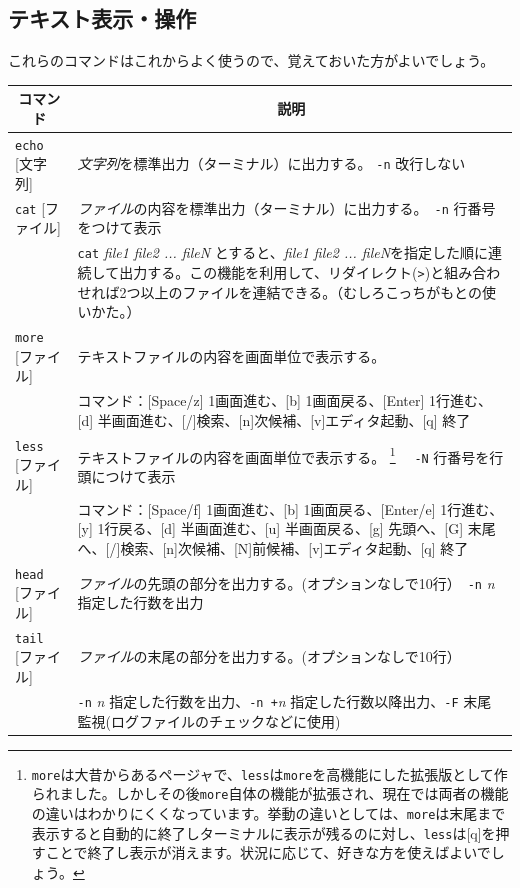 \documentclass[a4j]{ltjsreport}
\newcommand{\cn}[1]{\multirow{2}{*}{#1}}
\begin{document}
    \subsection{テキスト表示・操作}
    これらのコマンドはこれからよく使うので、覚えておいた方がよいでしょう。
    \begin{longtable}[c]{|p{3.5cm}|p{13.5cm}|}
        \hline
        \multicolumn{1}{|c|}{\textbf{コマンド}}&\multicolumn{1}{|c|}{\textbf{説明}}\\
        \hline\hline
        \texttt{echo} [文字列] &\emph{文字列}を標準出力（ターミナル）に出力する。 \texttt{-n} 改行しない\\
        \hline
        \texttt{cat} [ファイル] &\emph{ファイル}の内容を標準出力（ターミナル）に出力する。\ \texttt{-n} 行番号をつけて表示 \\
        &\texttt{cat} \textit{file1 file2 ... fileN} とすると、\textit{file1 file2 ... fileN}を指定した順に連続して出力する。この機能を利用して、リダイレクト(\verb|>|)と組み合わせれば2つ以上のファイルを連結できる。（むしろこっちがもとの使いかた。）\\
        \hline
        \texttt{more} [ファイル] &テキストファイルの内容を画面単位で表示する。\\
        &コマンド：[Space/z] 1画面進む、[b] 1画面戻る、[Enter] 1行進む、[d] 半画面進む、[/]検索、[n]次候補、[v]エディタ起動、[q] 終了\\
        \hline
        \texttt{less} [ファイル] &テキストファイルの内容を画面単位で表示する。
        \footnote{\texttt{more}は大昔からあるページャで、\texttt{less}は\texttt{more}を高機能にした拡張版として作られました。しかしその後\texttt{more}自体の機能が拡張され、現在では両者の機能の違いはわかりにくくなっています。挙動の違いとしては、\texttt{more}は末尾まで表示すると自動的に終了しターミナルに表示が残るのに対し、\texttt{less}は[q]を押すことで終了し表示が消えます。状況に応じて、好きな方を使えばよいでしょう。} 
        \ \ \texttt{-N} 行番号を行頭につけて表示\\
        &コマンド：[Space/f] 1画面進む、[b] 1画面戻る、[Enter/e] 1行進む、[y] 1行戻る、[d] 半画面進む、[u] 半画面戻る、[g] 先頭へ、[G] 末尾へ、[/]検索、[n]次候補、[N]前候補、[v]エディタ起動、[q] 終了\\
        \hline

        \texttt{head} [ファイル] &\emph{ファイル}の先頭の部分を出力する。(オプションなしで10行）\ \texttt{-n} \textit{n} 指定した行数を出力\\
        \hline
        \texttt{tail} [ファイル] &\emph{ファイル}の末尾の部分を出力する。(オプションなしで10行）\\
        &\texttt{-n} \textit{n} 指定した行数を出力、\texttt{-n +}\textit{n} 指定した行数以降出力、\texttt{-F} 末尾監視(ログファイルのチェックなどに使用)\\
        \hline


\end{longtable}
\end{document}
